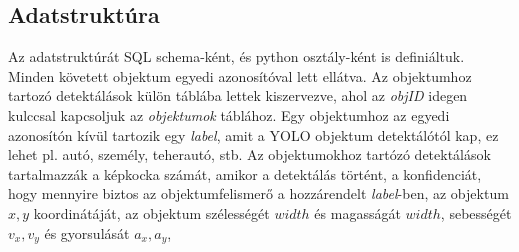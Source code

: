 \documentclass[12pt,a4paper]{article}
\begin{document}
\subsection{Adatstruktúra}
Az adatstruktúrát SQL schema-ként, és python osztály-ként is definiáltuk.
Minden követett objektum egyedi azonosítóval lett ellátva. Az objektumhoz tartozó detektálások külön táblába lettek kiszervezve,
ahol az \textit{objID} idegen kulccsal kapcsoljuk az \textit{objektumok} táblához. Egy objektumhoz az egyedi azonosítón kívül
tartozik egy \textit{label}, amit a YOLO objektum detektálótól kap, ez lehet pl. autó, személy, teherautó, stb. Az objektumokhoz
tartózó detektálások tartalmazzák a képkocka számát, amikor a detektálás történt, a konfidenciát, hogy mennyire biztos az
objektumfelismerő a hozzárendelt \textit{label}-ben, az objektum \begin{math}x,y\end{math} koordinátáját, az objektum szélességét
\begin{math}width\end{math} és magasságát \begin{math}width\end{math}, sebességét \begin{math}v_x,v_y\end{math} és gyorsulását \begin{math}a_x,a_y\end{math},
\end{document}
